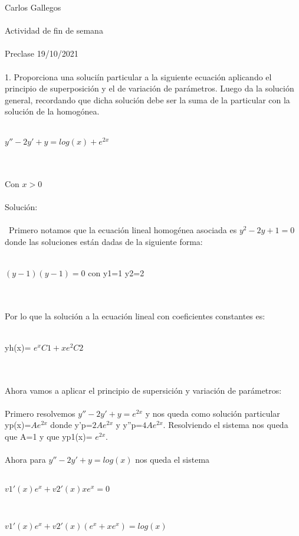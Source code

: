 \documentclass[a4paper,10pt]{article}
\title{}
\author{}
\date{}
\begin{document}
\maketitle
Carlos Gallegos\\\\
Actividad de fin de semana\\\\
Preclase 19/10/2021\\\\

1. Proporciona una soluciín particular a la siguiente ecuación
aplicando el principio de superposición y el de variación de
parámetros. Luego da la solución general, recordando que dicha
solución debe ser la suma de la particular con la solución de la
homogónea.\\\\
\centerline{$y'' - 2y' + y = log(x) + e^{2x}$}\\\\
Con $x>0$\\\\
Solución:\\\\\
Primero notamos que la ecuación lineal homogénea asociada es $y^2  - 2 y + 1 =0 $ donde las soluciones están dadas de la siguiente forma:\\\\
\centerline{$(y-1)(y-1)= 0 $ con y1=1 y2=2}\\\\
Por lo que la solución a la ecuación lineal con coeficientes constantes es:\\\\
\centerline{yh(x)= $ e^x C1 + xe^2 C2$}\\\\
Ahora vamos a aplicar el principio de supersición y variación de parámetros:\\\\
Primero resolvemos $y'' - 2y' + y =  e^{2x}$ y nos queda como solución particular yp(x)=$Ae^{2x}$ donde y'p=$2Ae^{2x}$ y y''p=$4Ae^{2x}$. Resolviendo el sistema nos queda que A=1 y que yp1(x)= $e^{2x}$.\\\\ 
Ahora para $y'' - 2y' + y =  log(x)$ nos queda el sistema\\\\
\centerline{$v1'(x)e^x + v2'(x)xe^x = 0$}\\
\centerline{$v1'(x)e^x + v2'(x)(e^x + xe^x) = log(x)$}\\\\
\end{document}
